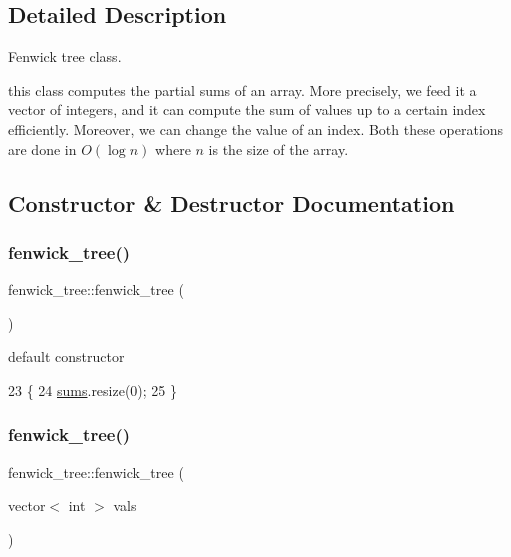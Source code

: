 \subsection{Detailed Description}
Fenwick tree class. 

this class computes the partial sums of an array. More precisely, we feed it a vector of integers, and it can compute the sum of values up to a certain index efficiently. Moreover, we can change the value of an index. Both these operations are done in $O(\log n)$ where $n$ is the size of the array. 

\subsection{Constructor \& Destructor Documentation}
\mbox{\label{classfenwick__tree_a6a23235d1eb40c9858057525d7ed6d70}} 
\subsubsection{\texorpdfstring{fenwick\+\_\+tree()}{fenwick\_tree()}\hspace{0.1cm}{\footnotesize\ttfamily [1/2]}}
{\footnotesize\ttfamily fenwick\+\_\+tree\+::fenwick\+\_\+tree (\begin{DoxyParamCaption}{ }\end{DoxyParamCaption})\hspace{0.3cm}{\ttfamily [inline]}}



default constructor 


\begin{DoxyCode}
23     \{
24       \hyperlink{classfenwick__tree_ac05c8fc17f358a38a2bab242f9164138}{sums}.resize(0);
25     \}
\end{DoxyCode}
\mbox{\label{classfenwick__tree_a35288559f8182d96aef8ddba5cb46adb}} 
\subsubsection{\texorpdfstring{fenwick\+\_\+tree()}{fenwick\_tree()}\hspace{0.1cm}{\footnotesize\ttfamily [2/2]}}
{\footnotesize\ttfamily fenwick\+\_\+tree\+::fenwick\+\_\+tree (\begin{DoxyParamCaption}\item[{vector$<$ int $>$}]{vals }\end{DoxyParamCaption})}



